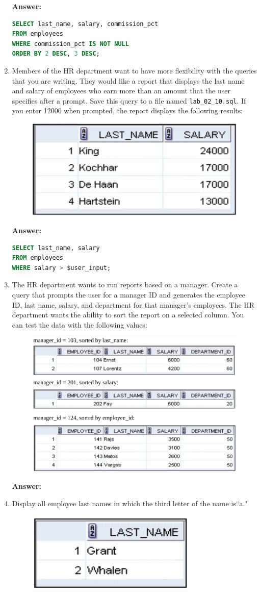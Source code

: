 \documentclass[a4paper,12pt]{article}
\begin{document}
\begin{enumerate}
    \textbf{Answer: }
    \begin{lstlisting}[language=SQL, label={lst:employees_data}]
SELECT last_name, salary, commission_pct
FROM employees
WHERE commission_pct IS NOT NULL
ORDER BY 2 DESC, 3 DESC;
    \end{lstlisting}
    \newpage
    \item Members of the HR department want to have more flexibility with the queries that you are
writing. They would like a report that displays the last name and salary of employees who earn
more than an amount that the user specifies after a prompt. Save this query to a file named
\texttt{lab\_02\_10.sql}. If you enter 12000 when prompted, the report displays the following
results:
\begin{figure}[h]
    \centering
    \includegraphics*[width=0.35\linewidth]{graphics/210.png}
\end{figure}

\textbf{Answer: }
    \begin{lstlisting}[language=SQL, label={lst:employees_data}]
SELECT last_name, salary
FROM employees
WHERE salary > $user_input;
    \end{lstlisting}
    \item The HR department wants to run reports based on a manager. Create a query that prompts the
user for a manager ID and generates the employee ID, last name, salary, and department for
that manager's employees. The HR department wants the ability to sort the report on a selected
column. You can test the data with the following values:
\begin{figure}[h]
    \centering
    \includegraphics*[width=.4\linewidth]{graphics/211.png}
\end{figure}

\textbf{Answer: }
    \item Display all employee last names in which the third letter of the name is``a."
\begin{figure}[h]
    \centering
    \includegraphics*[width=.4\linewidth]{graphics/212.png}
\end{figure}


\end{enumerate}
\end{document}
